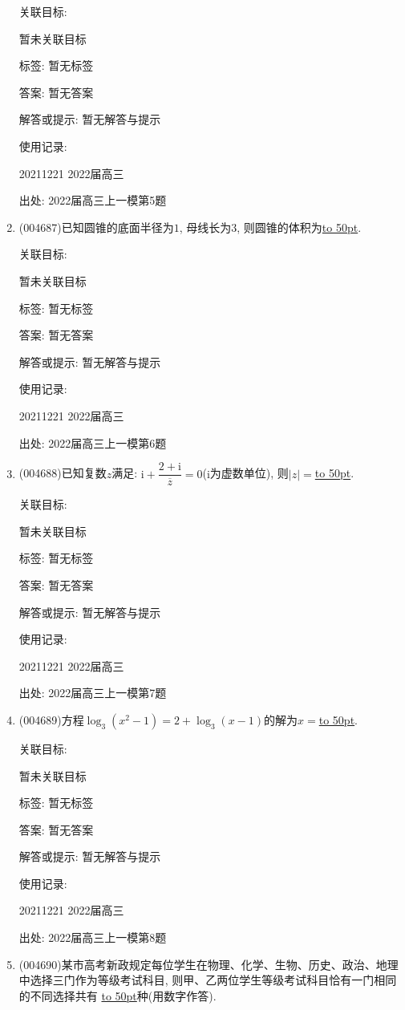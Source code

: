 \documentclass[10pt,a4paper]{article}
\newcommand{\blank}[1]{\underline{\hbox to #1pt{}}}
\begin{document}
\begin{enumerate}[1.]
关联目标:

暂未关联目标



标签: 暂无标签

答案: 暂无答案

解答或提示: 暂无解答与提示

使用记录:

20211221	2022届高三	


出处: 2022届高三上一模第5题
\item { (004687)}已知圆锥的底面半径为$1$, 母线长为$3$, 则圆锥的体积为\blank{50}.


关联目标:

暂未关联目标



标签: 暂无标签

答案: 暂无答案

解答或提示: 暂无解答与提示

使用记录:

20211221	2022届高三	


出处: 2022届高三上一模第6题
\item { (004688)}已知复数$z$满足: $\mathrm{i}+\dfrac{2+\mathrm{i}}{\overline z}=0$($\mathrm{i}$为虚数单位), 则$|z|=$\blank{50}.


关联目标:

暂未关联目标



标签: 暂无标签

答案: 暂无答案

解答或提示: 暂无解答与提示

使用记录:

20211221	2022届高三	


出处: 2022届高三上一模第7题
\item { (004689)}方程$\log_3(x^2-1)=2+\log_3(x-1)$的解为$x=$\blank{50}.


关联目标:

暂未关联目标



标签: 暂无标签

答案: 暂无答案

解答或提示: 暂无解答与提示

使用记录:

20211221	2022届高三	


出处: 2022届高三上一模第8题
\item { (004690)}某市高考新政规定每位学生在物理、化学、生物、历史、政治、地理中选择三门作为等级考试科目, 则甲、乙两位学生等级考试科目恰有一门相同的不同选择共有
\blank{50}种(用数字作答).



\end{enumerate}
\end{document}
